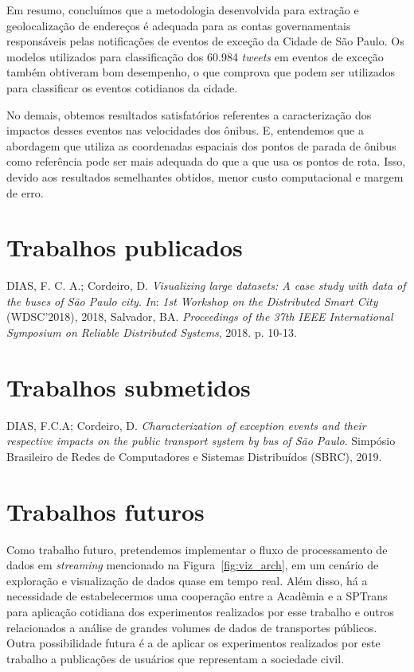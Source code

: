 \documentclass[
	12pt,				%
	oneside,			%
	a4paper,			%
	english,			%
	brazil				%
	]{abntex2ppgsi}
\begin{document}
{{Em resumo, concluímos que a metodologia desenvolvida para extração e geolocalização de endereços é adequada para as contas governamentais responsáveis pelas notificações de eventos de exceção da Cidade de São Paulo. Os modelos utilizados para classificação dos 60.984 \textit{tweets} em eventos de exceção também obtiveram bom desempenho, o que comprova que podem ser utilizados para classificar os eventos cotidianos da cidade. 

No demais, obtemos resultados satisfatórios referentes a caracterização dos impactos desses eventos nas velocidades dos ônibus. E, entendemos que a abordagem que utiliza as coordenadas espaciais dos pontos de parada de ônibus como referência pode ser mais adequada do que a que usa os pontos de rota. Isso, devido aos resultados semelhantes obtidos, menor custo computacional e margem de erro. 

\section{Trabalhos publicados}

DIAS, F. C. A.; Cordeiro, D. \textit{Visualizing large datasets: A case study with data of the buses of São Paulo city}. \textit{In}: \textit{1st Workshop on the Distributed Smart City} (WDSC'2018), 2018, Salvador, BA. \textit{Proceedings of the 37th IEEE International Symposium on Reliable Distributed Systems}, 2018. p. 10-13.

\section{Trabalhos submetidos}

DIAS, F.C.A; Cordeiro, D. \textit{Characterization of exception events and their respective impacts on the public transport system by bus of São Paulo}. Simpósio Brasileiro de Redes de Computadores e Sistemas Distribuídos (SBRC), 2019.

\section{Trabalhos futuros}
Como trabalho futuro, pretendemos implementar o fluxo de processamento de dados em \textit{streaming} mencionado na Figura~\ref{fig:viz_arch}, em um cenário de exploração e visualização de dados quase em tempo real.  Além disso, há a necessidade de estabelecermos uma cooperação entre a Acadêmia e a SPTrans para aplicação cotidiana dos experimentos realizados por esse trabalho e outros relacionados a análise de grandes volumes de dados de transportes públicos. Outra possibilidade futura é a de aplicar os experimentos realizados por este trabalho a publicações de usuários que representam a sociedade civil.

}}
\end{document}
